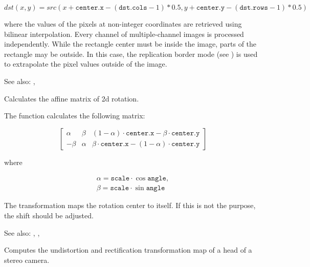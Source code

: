 \[
dst(x, y) = src(x + \texttt{center.x} - (\texttt{dst.cols}-1)*0.5, y + \texttt{center.y} - (\texttt{dst.rows}-1)*0.5)
\]

where the values of the pixels at non-integer coordinates are retrieved
using bilinear interpolation. Every channel of multiple-channel
images is processed independently. While the rectangle center
must be inside the image, parts of the rectangle may be
outside. In this case, the replication border mode (see ) is used to extrapolate
the pixel values outside of the image.

See also: , 

Calculates the affine matrix of 2d rotation.

\begin{description}
\end{description}

The function calculates the following matrix:

\[
\begin{bmatrix}
\alpha & \beta & (1-\alpha) \cdot \texttt{center.x} - \beta \cdot \texttt{center.y} \\
-\beta & \alpha & \beta \cdot \texttt{center.x} - (1-\alpha) \cdot \texttt{center.y}
\end{bmatrix}
\]

where

\[
\begin{array}{l}
\alpha = \texttt{scale} \cdot \cos \texttt{angle},\\
\beta = \texttt{scale} \cdot \sin \texttt{angle}
\end{array}
\]

The transformation maps the rotation center to itself. If this is not the purpose, the shift should be adjusted.

See also: , , 

Computes the undistortion and rectification transformation map of a head of a stereo camera.

